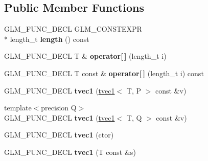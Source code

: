 \subsection*{Public Member Functions}
\begin{DoxyCompactItemize}
\item 
\hypertarget{structglm_1_1detail_1_1tvec1_ac5c47cd98cf8ea5fb932d211e287d474}{G\-L\-M\-\_\-\-F\-U\-N\-C\-\_\-\-D\-E\-C\-L G\-L\-M\-\_\-\-C\-O\-N\-S\-T\-E\-X\-P\-R \\*
length\-\_\-t {\bfseries length} () const }\label{structglm_1_1detail_1_1tvec1_ac5c47cd98cf8ea5fb932d211e287d474}

\item 
\hypertarget{structglm_1_1detail_1_1tvec1_adb575b50f9ef01bf4a6a4ecdfb82ac59}{G\-L\-M\-\_\-\-F\-U\-N\-C\-\_\-\-D\-E\-C\-L T \& {\bfseries operator\mbox{[}$\,$\mbox{]}} (length\-\_\-t i)}\label{structglm_1_1detail_1_1tvec1_adb575b50f9ef01bf4a6a4ecdfb82ac59}

\item 
\hypertarget{structglm_1_1detail_1_1tvec1_ac2a6b44e2d99aba17d96fcfec501da9a}{G\-L\-M\-\_\-\-F\-U\-N\-C\-\_\-\-D\-E\-C\-L T const \& {\bfseries operator\mbox{[}$\,$\mbox{]}} (length\-\_\-t i) const }\label{structglm_1_1detail_1_1tvec1_ac2a6b44e2d99aba17d96fcfec501da9a}

\item 
\hypertarget{structglm_1_1detail_1_1tvec1_a5c5c89fea0163e5ad580d6b66347c726}{G\-L\-M\-\_\-\-F\-U\-N\-C\-\_\-\-D\-E\-C\-L {\bfseries tvec1} (\hyperlink{structglm_1_1detail_1_1tvec1}{tvec1}$<$ T, P $>$ const \&v)}\label{structglm_1_1detail_1_1tvec1_a5c5c89fea0163e5ad580d6b66347c726}

\item 
\hypertarget{structglm_1_1detail_1_1tvec1_ae1002300caf6841b5a2effd442691db1}{{\footnotesize template$<$precision Q$>$ }\\G\-L\-M\-\_\-\-F\-U\-N\-C\-\_\-\-D\-E\-C\-L {\bfseries tvec1} (\hyperlink{structglm_1_1detail_1_1tvec1}{tvec1}$<$ T, Q $>$ const \&v)}\label{structglm_1_1detail_1_1tvec1_ae1002300caf6841b5a2effd442691db1}

\item 
\hypertarget{structglm_1_1detail_1_1tvec1_a52af6de6e305cdb9769a58fe40c9d0ae}{G\-L\-M\-\_\-\-F\-U\-N\-C\-\_\-\-D\-E\-C\-L {\bfseries tvec1} (ctor)}\label{structglm_1_1detail_1_1tvec1_a52af6de6e305cdb9769a58fe40c9d0ae}

\item 
\hypertarget{structglm_1_1detail_1_1tvec1_adf94a9b437d8033044ea754fbbb18614}{G\-L\-M\-\_\-\-F\-U\-N\-C\-\_\-\-D\-E\-C\-L {\bfseries tvec1} (T const \&s)}\label{structglm_1_1detail_1_1tvec1_adf94a9b437d8033044ea754fbbb18614}


\end{DoxyCompactItemize}
